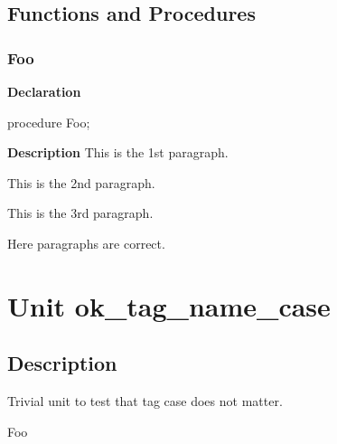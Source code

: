 \documentclass{report}
\newif\ifpdf
\begin{document}
\section{Functions and Procedures}
\ifpdf
\subsection*{\large{\textbf{Foo}}\normalsize\hspace{1ex}\hrulefill}
\else
\subsection*{Foo}
\fi
\label{ok_paragraph_in_single_line_comment-Foo}
\begin{list}{}{
\setlength{\itemindent}{0cm}
\setlength{\listparindent}{0cm}
\setlength{\leftmargin}{\evensidemargin}
\addtolength{\leftmargin}{\tmplength}
\settowidth{\labelsep}{X}
\addtolength{\leftmargin}{\labelsep}
\setlength{\labelwidth}{\tmplength}
}
\item[\textbf{Declaration}\hfill]
\ifpdf
\begin{flushleft}
\fi
\begin{ttfamily}
procedure Foo;\end{ttfamily}

\ifpdf
\end{flushleft}
\fi

\par
\item[\textbf{Description}]
This is the 1st paragraph.

This is the 2nd paragraph.

This is the 3rd paragraph.

Here paragraphs are correct.

\end{list}
\chapter{Unit ok{\_}tag{\_}name{\_}case}
\label{ok_tag_name_case}
\section{Description}
Trivial unit to test that tag case does not matter.

\begin{ttfamily}Foo\end{ttfamily}
\end{document}
